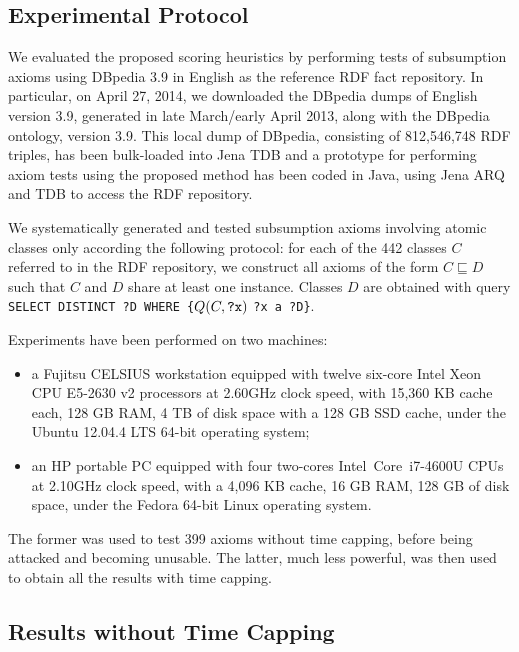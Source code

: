 \documentclass{llncs}
\begin{document}


\subsection{Experimental Protocol}

We evaluated the proposed scoring heuristics by performing tests of subsumption
axioms using DBpedia 3.9 in English as the reference RDF fact repository.
In particular, on April 27, 2014, we downloaded the DBpedia dumps of English version 3.9,
generated in late March/early April 2013, along with the DBpedia ontology, version 3.9.
This local dump of DBpedia, consisting of 812,546,748 RDF triples,
has been bulk-loaded into Jena TDB and a prototype
for performing axiom tests using the proposed method has been coded in Java,
using Jena ARQ and TDB to access the RDF repository.

We systematically generated and tested subsumption axioms
involving atomic classes only according the following protocol:
for each of the 442 classes $C$ referred to in the RDF repository,
we construct all axioms of the form $C \sqsubseteq D$ such that $C$ and $D$
share at least one instance. Classes $D$ are obtained with query
\texttt{SELECT DISTINCT ?D WHERE \{}$Q(C, \mbox{\tt ?x})$ \texttt{?x a ?D\}}.

Experiments have been performed on two machines:
\begin{itemize}
\item a Fujitsu CELSIUS workstation equipped
with twelve six-core Intel Xeon CPU E5-2630 v2 processors at 2.60GHz clock speed,
with 15,360 KB cache each, 128 GB RAM,
4 TB of disk space with a 128 GB SSD cache,
under the Ubuntu  12.04.4 LTS 64-bit operating system;
\item an HP  portable PC equipped
with four two-cores Intel\textregistered\ Core\texttrademark\ i7-4600U CPUs at 2.10GHz clock speed,
with a 4,096 KB cache, 16 GB RAM,
128 GB of disk space,
under the Fedora 64-bit Linux operating system.
\end{itemize}
The former was used to test 399 axioms without time capping,
before being attacked and becoming unusable.
The latter, much less powerful, was then used to obtain all the results with
time capping.




\subsection{Results without Time Capping}
\label{results-no-timeout}
\end{document}
